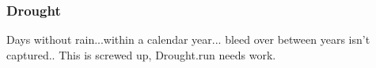 \documentclass{article}
\begin{document}
\begin{knitrout}
\color{fgcolor}\begin{kframe}


{\ttfamily\noindent\bfseries\color{errorcolor}{\#\# Error in fortify(data): object 'PRCP.Season.Total' not found}}\end{kframe}
\end{knitrout}

\subsubsection{Drought}

Days without rain...within a calendar year... bleed over between years isn't captured.. This is screwed up, Drought.run needs work.
\end{document}
